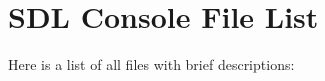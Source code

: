 \section{SDL Console File List}
Here is a list of all files with brief descriptions:\begin{CompactList}
\item{}
\item{}
\end{CompactList}

